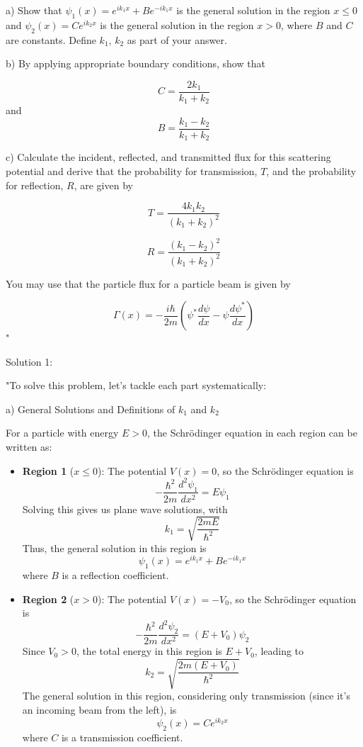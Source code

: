 a) Show that \( \psi_{1}(x) = e^{ik_{1}x} + Be^{-ik_{1}x} \) is the general solution in the region \( x \leq 0 \) and \( \psi_{2}(x) = Ce^{ik_{2}x} \) is the general solution in the region \( x > 0 \), where \( B \) and \( C \) are constants. Define \( k_{1} \), \( k_{2} \) as part of your answer.

b) By applying appropriate boundary conditions, show that 

\[ C = \frac{2k_{1}}{k_{1}+k_{2}} \] and \[ B = \frac{k_{1}-k_{2}}{k_{1}+k_{2}} \]

c) Calculate the incident, reflected, and transmitted flux for this scattering potential and derive that the probability for transmission, \( T \), and the probability for reflection, \( R \), are given by 

\[ T = \frac{4k_{1}k_{2}}{(k_{1}+k_{2})^{2}} \]

\[ R = \frac{(k_{1}-k_{2})^{2}}{(k_{1}+k_{2})^{2}} \]

You may use that the particle flux for a particle beam is given by 

\[ \Gamma(x) = -\frac{i\hbar}{2m} \left(\psi^{*}\frac{d\psi}{dx} - \psi\frac{d\psi^{*}}{dx} \right) \]"

Solution 1:

"To solve this problem, let's tackle each part systematically:

a) General Solutions and Definitions of \(k_1\) and \(k_2\)

For a particle with energy \(E > 0\), the Schrödinger equation in each region can be written as:

\begin{itemize}
    \item \textbf{Region 1} (\(x \leq 0\)): The potential \(V(x) = 0\), so the Schrödinger equation is
    \[ -\frac{\hbar^2}{2m} \frac{d^2\psi_1}{dx^2} = E\psi_1 \]
    Solving this gives us plane wave solutions, with
    \[ k_1 = \sqrt{\frac{2mE}{\hbar^2}} \]
    Thus, the general solution in this region is
    \[ \psi_1(x) = e^{ik_1x} + Be^{-ik_1x} \]
    where \(B\) is a reflection coefficient.

    \item \textbf{Region 2} (\(x > 0\)): The potential \(V(x) = -V_0\), so the Schrödinger equation is
    \[ -\frac{\hbar^2}{2m} \frac{d^2\psi_2}{dx^2} = (E + V_0)\psi_2 \]
    Since \(V_0 > 0\), the total energy in this region is \(E + V_0\), leading to
    \[ k_2 = \sqrt{\frac{2m(E + V_0)}{\hbar^2}} \]
    The general solution in this region, considering only transmission (since it's an incoming beam from the left), is
    \[ \psi_2(x) = Ce^{ik_2x} \]
    where \(C\) is a transmission coefficient.
\end{itemize}

